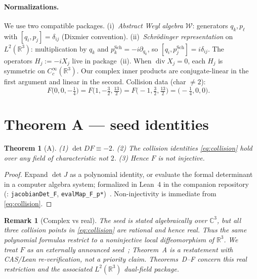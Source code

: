 ﻿\documentclass[11pt]{article}
\newcommand{\filepath}[1]{\path{#1}}
\newtheorem{theorem}{Theorem}
\newtheorem{remark}{Remark}
\begin{document}
\paragraph{Normalizations.}
We use two compatible packages. (i)~\emph{Abstract Weyl algebra} \(\mathcal{W}\): generators \(q_k,p_\ell\) with \([q_i,p_j]=\delta_{ij}\) (Dixmier convention). (ii)~\emph{Schr\"odinger representation} on \(L^2(\mathbb{R}^3)\): multiplication by \(q_k\) and \(p_k^{\mathrm{Sch}}=-i\partial_{q_k}\), so \([q_i,p_j^{\mathrm{Sch}}]=i\delta_{ij}\). The operators \(H_j:=-iX_j\) live in package~(ii). When \(\operatorname{div} X_j=0\), each \(H_j\) is symmetric on \(C_c^\infty(\mathbb{R}^3)\). Our complex inner products are conjugate-linear in the first argument and linear in the second. Collision data (char \(\neq 2\)):
\begin{equation}
F\bigl(0,0,-\tfrac14\bigr)
=F\bigl(1,-\tfrac32,\tfrac{13}2\bigr)
=F\bigl(-1,\tfrac32,\tfrac{13}2\bigr)
=\bigl(-\tfrac14,0,0\bigr).
\label{eq:collision}
\end{equation}

\section{Theorem A --- seed identities}
\begin{theorem}[A]
(1) \(\det DF\equiv -2\).
(2) The collision identities \eqref{eq:collision} hold over any field of characteristic not \(2\).
(3) Hence \(F\) is not injective.
\end{theorem}
\begin{proof}
Expand \(\det J\) as a polynomial identity, or evaluate the formal determinant in a computer algebra system; formalized in Lean~4 in the companion repository
(\filepath{ExoticCCR/AnchorF.lean}: \texttt{jacobianDet\_F}, \texttt{evalMap\_F\_p*})~\cite{FredriksenLean}.
Non-injectivity is immediate from \eqref{eq:collision}.
\end{proof}

\begin{remark}[Complex vs real]
The seed is stated algebraically over \(\mathbb{C}^3\), but all three collision
points in \eqref{eq:collision} are rational and hence real. Thus the same
polynomial formulas restrict to a noninjective local diffeomorphism of
\(\mathbb{R}^3\). We treat \(F\) as an externally announced
seed~\cite{Alpoge2026,UlamJacobian,AFPJacobian}; Theorem~A is a restatement
with CAS/Lean re-verification, not a priority claim. Theorems~D--F concern this
real restriction and the associated \(L^2(\mathbb{R}^3)\) dual-field package.
\end{remark}
\end{document}
